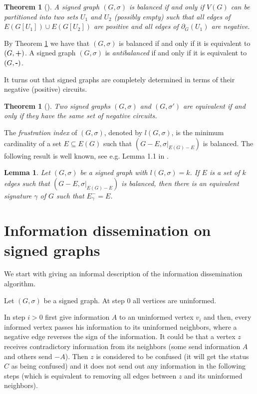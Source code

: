 \documentclass[a4paper,11pt]{article}
\newtheorem{theo}[defi]{Theorem}
\newtheorem{lem}[defi]{Lemma}
\theoremstyle{remark}
\begin{document}
\begin{theo} [\cite{Balance}] \label{Thm: character_balanced}
A signed graph $(G,\sigma)$ is balanced if and only if $V(G)$ can be partitioned into two sets $U_1$ and $U_2$ (possibly empty)
such that all edges of $E(G[U_1]) \cup E(G[U_2])$ are positive and all edges of $\partial_G(U_1)$ are negative.  
\end{theo}

By Theorem \ref{Thm: character_balanced} we have that $(G, \sigma)$ is balanced if and only if it is equivalent to $(G,\texttt{\bf +})$. 
A signed graph $(G,\sigma)$ is \emph{antibalanced} if and only if it is equivalent to 
$(G,\texttt{\bf -})$. 

It turns out that signed graphs are completely determined in terms of their
negative (positive) circuits. 

\begin{theo} [\cite{SignedGraphs}] \label{equ_classes}
Two signed graphs $(G,\sigma)$ and $(G,\sigma')$ are equivalent if and only if they have the same set of negative circuits. 
\end{theo}

The \emph{frustration index} of $(G,\sigma)$, denoted by $l(G,\sigma)$,
is the minimum cardinality of a set $E \subseteq E(G)$ such that
$(G-E, \sigma \vert_{E(G)-E})$ is balanced. The following result is well known, see e.g. Lemma 1.1 in \cite{cappello2022frustration}.


\begin{lem} \label{Lem: Min_signature}
Let $(G,\sigma)$ be a signed graph with $l(G,\sigma)=k$. 
If $E$ is a set of $k$ edges such that $(G-E, \sigma\vert_{E(G)-E})$ is balanced, 
then there is an equivalent signature $\gamma$ of $G$ such that $E_{\gamma}^- = E$.
\end{lem}


\section{Information dissemination on signed graphs} \label{Sec: (G,sigma) special cases}

We start with giving an informal description of the information dissemination algorithm.  

Let $(G,\sigma)$ be a signed graph. At step $0$ all vertices are uninformed. 

In step $i > 0$ first give information $A$ to an uninformed vertex $v_i$ and then, 
every informed vertex passes his information to its uninformed neighbors, where a negative edge
reverses the sign of the information. It could be that a vertex $z$ receives contradictory information from its neighbors (some send information $A$ and others send $-A$). Then $z$ is considered to be confused (it will get the status $C$ as being confused) and it does not send out any information 
in the following steps (which is equivalent to removing all edges between
$z$ and its uninformed neighbors). 
\end{document}
